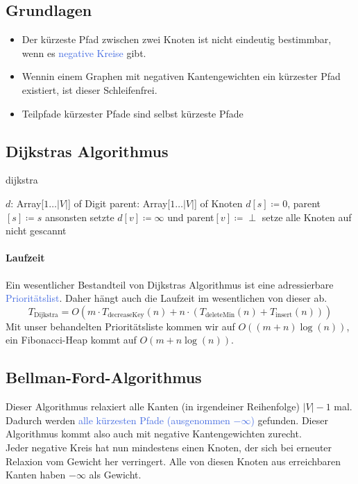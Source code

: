 \documentclass[11pt]{article}
\def \texcol{RoyalBlue}
\begin{document}
\subsection{Grundlagen}
\begin{itemize}
\item Der kürzeste Pfad zwischen zwei Knoten ist nicht eindeutig bestimmbar, wenn es \textcolor{\texcol}{negative Kreise} gibt.
\item Wennin einem Graphen mit negativen Kantengewichten ein kürzester Pfad existiert, ist dieser Schleifenfrei.
\item Teilpfade kürzester Pfade sind selbst kürzeste Pfade
\end{itemize}

\subsection{Dijkstras Algorithmus}
\begin{algorithm}[H]
\caption{dijkstra}
\DontPrintSemicolon
{}
$d$: Array[$1\dots |V|$] of Digit\;
parent: Array[$1\dots |V|$] of Knoten\;
$d[s]\coloneqq 0$, parent$[s]\coloneqq s$\;
ansonsten setzte $d[v]\coloneqq \infty$ und parent$[v]\coloneqq\perp$\;
setze alle Knoten auf nicht gescannt\;
\end{algorithm}

\paragraph{Laufzeit}Ein wesentlicher Bestandteil von Dijkstras Algorithmus ist eine adressierbare \textcolor{\texcol}{Prioritätslist}. Daher hängt auch die Laufzeit im wesentlichen von dieser ab. 
\[T_{\text{Dijkstra}}=O(m\cdot T_{\text{decreaseKey}}(n) + n\cdot (T_{\text{deleteMin}}(n) + T_{\text{insert}}(n)))\]
Mit unser behandelten Prioritätsliste kommen wir auf $O((m+n)\log(n))$, ein Fibonacci-Heap kommt auf $O(m+n\log(n))$.

\subsection{Bellman-Ford-Algorithmus}
Dieser Algorithmus relaxiert alle Kanten (in irgendeiner Reihenfolge) $|V|-1$ mal. Dadurch werden \textcolor{\texcol}{alle kürzesten Pfade (ausgenommen $-\infty$)} gefunden. Dieser Algorithmus kommt also auch mit negative Kantengewichten zurecht.\\
Jeder negative Kreis hat nun mindestens einen Knoten, der sich bei erneuter Relaxion vom Gewicht her verringert. Alle von diesen Knoten aus erreichbaren Kanten haben $-\infty$ als Gewicht.
\end{document}
